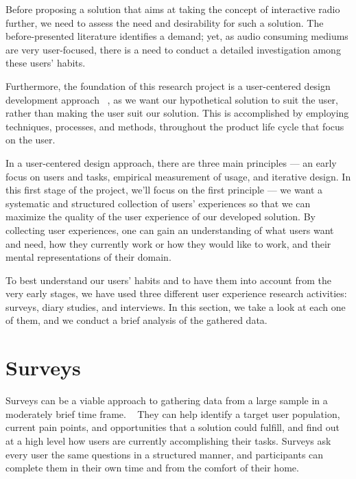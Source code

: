 \cleardoublepage
\label{chap:architecture}

Before proposing a solution that aims at taking the concept of interactive radio further, we need to assess the need and desirability for such a solution. The before-presented literature identifies a demand; yet, as audio consuming mediums are very user-focused, there is a need to conduct a detailed investigation among these users' habits.

Furthermore, the foundation of this research project is a user-centered design development approach ~\cite{McLoone2010}, as we want our hypothetical solution to suit the user, rather than making the user suit our solution. This is accomplished by employing techniques, processes, and methods, throughout the product life cycle that focus on the user. ~\cite{Courage2005} 

In a user-centered design approach, there are three main principles — an early focus on users and tasks, empirical measurement of usage, and iterative design. In this first stage of the project, we'll focus on the first principle — we want a systematic and structured collection of users’ experiences so that we can maximize the quality of the user experience of our developed solution. By collecting user experiences, one can gain an understanding of what users want and need, how they currently work or how they would like to work, and their mental representations of their domain.

To best understand our users' habits and to have them into account from the very early stages, we have used three different user experience research activities: surveys, diary studies, and interviews. In this section, we take a look at each one of them, and we conduct a brief analysis of the gathered data.


\section{Surveys}
Surveys can be a viable approach to gathering data from a large sample in a moderately brief time frame. ~\cite{Courage2005} They can help identify a target user population, current pain points, and opportunities that a solution could fulfill, and find out at a high level how users are currently accomplishing their tasks. Surveys ask every user the same questions in a structured manner, and participants can complete them in their own time and from the comfort of their home.

